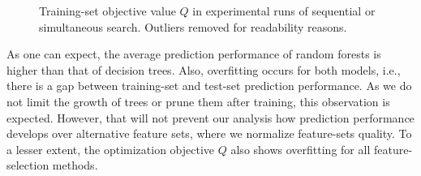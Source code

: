\documentclass[conference]{IEEEtran}
\theoremstyle{definition}
\begin{document}
\begin{figure}[t]
	\centering
	\hfill
	\caption{Training-set objective value $Q$ in experimental runs of sequential or simultaneous search.
		Outliers removed for readability reasons.}
	\label{fig:impact-search-objective}
\end{figure}

As one can expect, the average prediction performance of random forests is higher than that of decision trees.
Also, overfitting occurs for both models, i.e., there is a gap between training-set and test-set prediction performance.
As we do not limit the growth of trees or prune them after training, this observation is expected.
However, that will not prevent our analysis how prediction performance develops over alternative feature sets, where we normalize feature-sets quality.
To a lesser extent, the optimization objective $Q$ also shows overfitting for all feature-selection methods.
\end{document}
